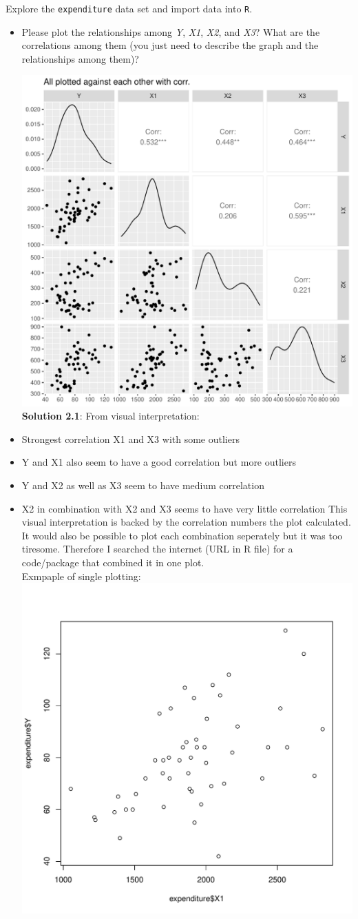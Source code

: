 \documentclass[12pt,letterpaper]{article}
\begin{document}
\vspace{.5cm}
\noindent Explore the \texttt{expenditure} data set and import data into \texttt{R}.
\vspace{.5cm}
  
\vspace{.5cm}
\begin{itemize}

\item
Please plot the relationships among \emph{Y}, \emph{X1}, \emph{X2}, and \emph{X3}? What are the correlations among them (you just need to describe the graph and the relationships among them)?
\vspace{.5cm}

\includegraphics[width=.50\textwidth]{plot2.pdf} \\

\textbf{Solution 2.1}: From visual interpretation: 
\item Strongest correlation X1 and X3 with some outliers
\item Y and X1 also seem to have a good correlation but more outliers
\item Y and X2 as well as X3 seem to have medium correlation
\item X2 in combination with X2 and X3 seems to have very little correlation
This visual interpretation is backed by the correlation numbers the plot calculated. \\

It would also be possible to plot each combination seperately but it was too tiresome. Therefore I searched the internet (URL in R file) for a code/package that combined it in one plot.\\
Exmpaple of single plotting:\\
\includegraphics[width=.50\textwidth]{plot1.pdf} \\


\end{itemize}
\end{document}
